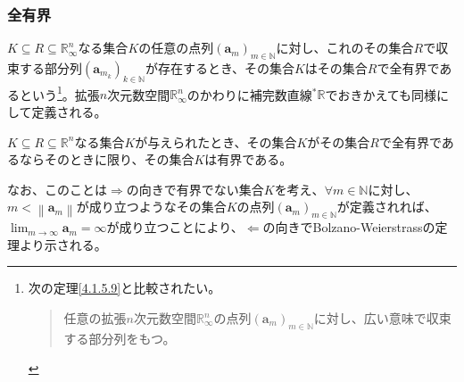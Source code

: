 \documentclass[dvipdfmx]{jsarticle}
\begin{document}
\subsubsection{全有界}%
\begin{dfn}
$K \subseteq R \subseteq \mathbb{R}_{\infty}^{n}$なる集合$K$の任意の点列$\left( \mathbf{a}_{m} \right)_{m \in \mathbb{N}}$に対し、これのその集合$R$で収束する部分列$\left( \mathbf{a}_{m_{k}} \right)_{k \in \mathbb{N}}$が存在するとき、その集合$K$はその集合$R$で全有界であるという\footnote{次の定理\ref{4.1.5.9}と比較されたい。
\begin{quote}
  任意の拡張$n$次元数空間$\mathbb{R}_{\infty}^{n}$の点列$\left( \mathbf{a}_{m} \right)_{m \in \mathbb{N}}$に対し、広い意味で収束する部分列をもつ。
\end{quote}
}。拡張$n$次元数空間$\mathbb{R}_{\infty}^{n}$のかわりに補完数直線${}^{*}\mathbb{R}$でおきかえても同様にして定義される。
\end{dfn}
\begin{thm}\label{4.1.7.5}
$K \subseteq R \subseteq \mathbb{R}^{n}$なる集合$K$が与えられたとき、その集合$K$がその集合$R$で全有界であるならそのときに限り、その集合$K$は有界である。\par
なお、このことは$\Rightarrow$の向きで有界でない集合$K$を考え、$\forall m \in \mathbb{N}$に対し、$m < \left\| \mathbf{a}_{m} \right\|$が成り立つようなその集合$K$の点列$\left( \mathbf{a}_{m} \right)_{m \in \mathbb{N}}$が定義されれば、$\lim_{m \rightarrow \infty}\mathbf{a}_{m} = \infty$が成り立つことにより、$\Leftarrow$の向きでBolzano-Weierstrassの定理より示される。
\end{thm}
\end{document}
